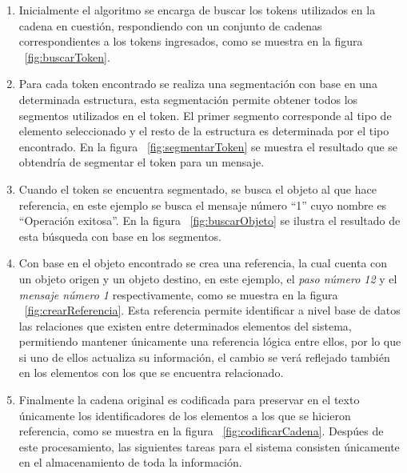 	
	\begin{enumerate}
		\item Inicialmente el algoritmo se encarga de buscar los tokens utilizados en la cadena en cuestión, respondiendo con un conjunto de cadenas correspondientes a los tokens ingresados, como se muestra en la figura ~\ref{fig:buscarToken}.
		
		\newpage
		
		\item Para cada token encontrado se realiza una segmentación con base en una determinada estructura, esta segmentación permite obtener todos los segmentos utilizados en el token. El primer segmento corresponde al tipo de elemento seleccionado y el resto de la estructura es determinada por el tipo encontrado. En la figura ~\ref{fig:segmentarToken} se muestra el resultado que se obtendría de segmentar el token para un mensaje.
		
		
		\item Cuando el token se encuentra segmentado, se busca el objeto al que hace referencia, en este ejemplo se busca el mensaje número ``1'' cuyo nombre es ``Operación exitosa''. En la figura ~\ref{fig:buscarObjeto} se ilustra el resultado de esta búsqueda con base en los segmentos. 
		
		
		\item Con base en el objeto encontrado se crea una referencia, la cual cuenta con un objeto origen y un objeto destino, en este ejemplo, el {\it paso número 12} y el {\it mensaje número 1} respectivamente, como se muestra en la figura ~\ref{fig:crearReferencia}. Esta referencia permite identificar a nivel base de datos las relaciones que existen entre determinados elementos del sistema, permitiendo mantener únicamente una referencia lógica entre ellos, por lo que si uno de ellos actualiza su información, el cambio se verá reflejado también en los elementos con los que se encuentra relacionado.
		
\newpage
		\item Finalmente la cadena original es codificada para preservar en el texto únicamente los identificadores de los elementos a los que se hicieron referencia, como se muestra en la figura ~\ref{fig:codificarCadena}. Despúes de este procesamiento, las siguientes tareas para el sistema consisten únicamente en el almacenamiento de toda la información.
				
		
			
	\end{enumerate}
	
